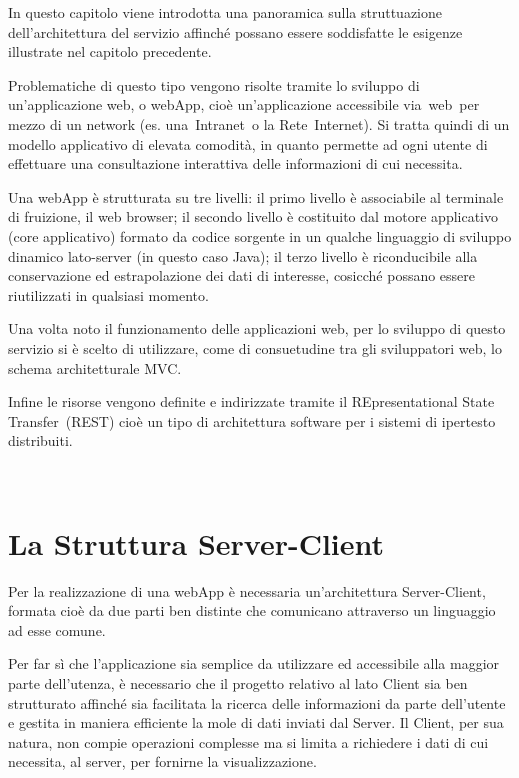 In questo capitolo viene introdotta una panoramica sulla struttuazione dell’architettura del servizio affinché possano essere soddisfatte le esigenze illustrate nel capitolo precedente.

Problematiche di questo tipo vengono risolte tramite lo sviluppo di un’applicazione web, o webApp, cioè un'applicazione accessibile via web per mezzo di un network (es. una Intranet o la Rete Internet). Si tratta quindi di un modello applicativo di elevata comodità, in quanto permette ad ogni utente di effettuare una consultazione interattiva delle informazioni di cui necessita.

Una webApp è strutturata su tre livelli: il primo livello è associabile al terminale di fruizione, il web browser; il secondo livello è costituito dal motore applicativo (core applicativo) formato da codice sorgente in un qualche linguaggio di sviluppo dinamico lato-server (in questo caso Java); il terzo livello è riconducibile alla conservazione ed estrapolazione dei dati di interesse, cosicché possano essere riutilizzati in qualsiasi momento.

Una volta noto il funzionamento delle applicazioni web, per lo sviluppo di questo servizio si è scelto di utilizzare, come di consuetudine tra gli sviluppatori web, lo schema architetturale MVC.

Infine le risorse vengono definite e indirizzate tramite il REpresentational State Transfer (REST) cioè un tipo di architettura software per i sistemi di ipertesto distribuiti.

 \section{La Struttura Server-Client} %
\label{sec:la_struttura_server_client}

Per la realizzazione di una webApp è necessaria un’architettura Server-Client, formata cioè da due parti ben distinte che comunicano attraverso un linguaggio ad esse comune.

Per far sì che l’applicazione sia semplice da utilizzare ed accessibile alla maggior parte dell’utenza, è necessario che il progetto relativo al lato Client sia ben strutturato affinché sia facilitata la ricerca delle informazioni da parte dell’utente e gestita in maniera efficiente la mole di dati inviati dal Server.
Il Client, per sua natura, non compie operazioni complesse ma si limita a richiedere i dati di cui necessita, al server, per fornirne la visualizzazione. 


